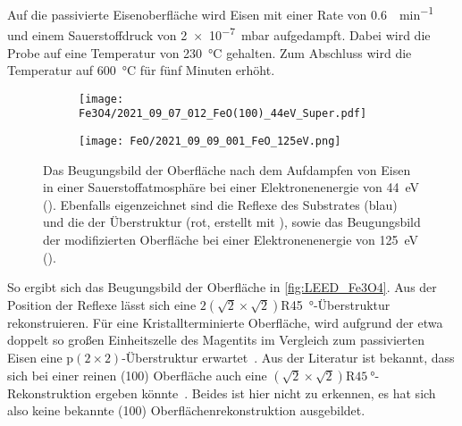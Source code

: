         Auf die passivierte Eisenoberfläche wird Eisen mit einer Rate von \SI{0.6}{\ML\per\minute} und einem Sauerstoffdruck von \SI{2e-7}{\milli\bar} aufgedampft.
        Dabei wird die Probe auf eine Temperatur von \SI{230}{\celsius} gehalten.
        Zum Abschluss wird die Temperatur auf \SI{600}{\celsius} für fünf Minuten erhöht.
        \begin{figure}
            \begin{subfigure}[t]{0.48\textwidth}
                \centering
                \texttt{[image: Fe3O4/2021\_09\_07\_012\_FeO(100)\_44eV\_Super.pdf]}
                \subcaption{}
                \label{fig:LEED_Fe3O4}
            \end{subfigure}
            \begin{subfigure}[t]{0.48\textwidth}
                \centering
                \texttt{[image: FeO/2021\_09\_09\_001\_FeO\_125eV.png]}
                \subcaption{}
                \label{fig:LEED_FeO}
            \end{subfigure}
            \caption{Das Beugungsbild der Oberfläche nach dem Aufdampfen von Eisen in einer Sauerstoffatmosphäre bei einer Elektronenenergie von \SI{44}{\electronvolt} ().
            Ebenfalls eigenzeichnet sind die Reflexe des Substrates (blau) und die der Überstruktur (rot, erstellt mit \cite{SpotPlotter}), sowie das Beugungsbild der modifizierten Oberfläche bei einer Elektronenenergie von \SI{125}{\electronvolt} ().}
        \end{figure}
        So ergibt sich das Beugungsbild der Oberfläche in \autoref{fig:LEED_Fe3O4}.
        Aus der Position der Reflexe lässt sich eine $2\left(\sqrt{2}\times\sqrt{2}\right)$R\SI{45}{\degree}-Überstruktur rekonstruieren.
        Für eine Kristallterminierte Oberfläche, wird aufgrund der etwa doppelt so großen Einheitszelle des Magentits im Vergleich zum passivierten Eisen eine p$(2\times2)$-Überstruktur erwartet~\cite{FeO_1}.
        Aus der Literatur ist bekannt, dass sich bei einer reinen (100) Oberfläche auch eine $\left(\sqrt{2}\times\sqrt{2}\right)\text{R}\SI{45}{\degree}$-Rekonstruktion ergeben könnte~\cite{ruwisch_vsm-untersuchung_2016}.
        Beides ist hier nicht zu erkennen, es hat sich also keine bekannte (100) Oberflächenrekonstruktion ausgebildet.

